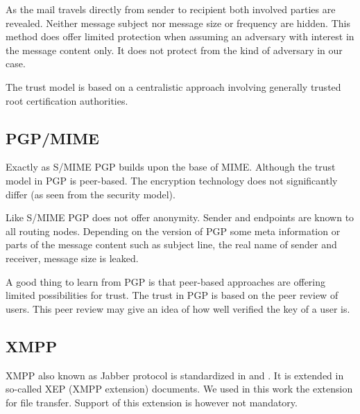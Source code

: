 As the mail travels directly from sender to recipient both involved parties are revealed. Neither message subject nor message size or frequency are hidden. This method does offer limited protection when assuming an adversary with interest in the message content only. It does not protect from the kind of adversary in our case. 

The trust model is based on a centralistic approach involving generally trusted root certification authorities.

\subsection{PGP/MIME}
Exactly as S/MIME PGP\cite{RFC4880} builds upon the base of MIME. Although the trust model in PGP is peer-based. The encryption technology does not significantly differ (as seen from the security model).

Like S/MIME PGP does not offer anonymity. Sender and endpoints are known to all routing nodes. Depending on the version of PGP some meta information or parts of the message content such as subject line, the real name of sender and receiver, message size is leaked.

A good thing to learn from PGP is that peer-based approaches are offering limited possibilities for trust. The trust in PGP is based on the peer review of users. This peer review may give an idea of how well verified the key of a user is.

\subsection{XMPP}
XMPP also known as Jabber protocol is standardized in \cite{RFC6120} and \cite{RFC6121}. It is extended in so-called XEP (XMPP extension) documents. We used in this work the extension \cite{xep0234} for file transfer. Support of this extension is however not mandatory.

